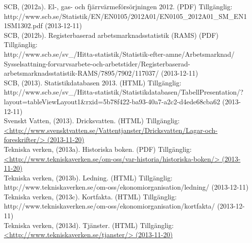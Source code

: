 \documentclass[10pt,a4paper]{article}
\begin{document}
SCB, (2012a). El-, gas- och fjärrvärmeförsörjningen 2012. (PDF) Tillgänglig:\\
http://www.scb.se/Statistik/EN/EN0105/2012A01/EN0105\_2012A01\_SM\_EN11SM1302.pdf (2013-12-11)\\

SCB, (2012b). Registerbaserad arbetsmarknadsstatistik (RAMS) (PDF) Tillgänglig:\\
http://www.scb.se/sv\_/Hitta-statistik/Statistik-efter-amne/Arbetsmarknad/ \\Sysselsattning-forvarvsarbete-och-arbetstider/Registerbaserad-arbetsmarknadsstatistik-RAMS/7895/7902/117037/ (2013-12-11)\\

SCB, (2013). Statistikdatabasen 2013. (HTML) Tillgänglig:\\
http://www.scb.se/sv\_/Hitta-statistik/Statistikdatabasen/TabellPresentation/?\\layout=tableViewLayout1\&rxid=5b78f422-ba93-40a7-a2c2-d4ede68cba62 (2013-12-11)\\

Svenskt Vatten, (2013). Dricksvatten. (HTML) Tillgänglig: \\
\hyperref{http://www.svensktvatten.se/Vattentjanster/Dricksvatten/Lagar-och-foreskrifter/}{}{}{<http://www.svensktvatten.se/Vattentjanster/Dricksvatten/Lagar-och-foreskrifter/>
(2013-11-20)} \\

Tekniska verken, (2013a). Historiska boken. (PDF) Tillgänglig: \\
\hyperref{http://www.tekniskaverken.se/om-oss/var-historia/historiska-boken/}{}{}{<http://www.tekniskaverken.se/om-oss/var-historia/historiska-boken/> (2013-11-20)}\\

Tekniska verken, (2013b). Ledning. (HTML) Tillgänglig: \\
http://www.tekniskaverken.se/om-oss/ekonomiorganisation/ledning/ (2013-12-11)\\

Tekniska verken, (2013c). Kortfakta. (HTML) Tillgänglig: \\
http://www.tekniskaverken.se/om-oss/ekonomiorganisation/kortfakta/ (2013-12-11)\\

Tekniska verken, (2013d). Tjänster. (HTML) Tillgänglig: \\
\hyperref{http://www.tekniskaverken.se/tjanster/}{}{}{<http://www.tekniskaverken.se/tjanster/>
  (2013-11-20)}\\
\end{document}
